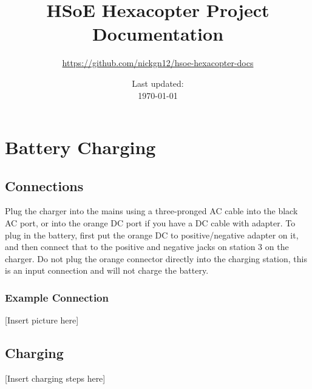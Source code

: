 \documentclass{style}
\title{HSoE Hexacopter Project Documentation}
\author{\url{https://github.com/nickgn12/hsoe-hexacopter-docs}}
\date{Last updated:\\ \today{}}
\begin{document}
\maketitle
\newpage
\tableofcontents
\newpage
\section{Battery Charging}
\subsection{Connections}
Plug the charger into the mains using a three-pronged AC cable into the black AC port, or into the orange DC port if you have a DC cable with adapter.
To plug in the battery, first put the orange DC to positive/negative adapter on it, and then connect that to the positive and negative jacks on station 3 on the charger.
Do not plug the orange connector directly into the charging station, this is an input connection and will not charge the battery.
\subsubsection{Example Connection}
[Insert picture here]
\subsection{Charging}
[Insert charging steps here]
\end{document}
